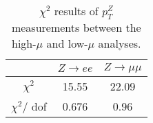 \begin{table}[h]
 \centering
\begin{tabular}{|c|c|c|}
\hline
  & $Z\rightarrow ee$ & $Z\rightarrow \mu\mu$\\
 \hline
 $\chi^2$ & 15.55 & 22.09 \\
 \hline
$\chi^2/$ dof & 0.676 & 0.96\\
\hline
\end{tabular}
\caption{$\chi^2$ results of $p_{T}^{Z}$ measurements between the high-$\mu$ and low-$\mu$  analyses.}
\label{tab:chi2highmuRew}
\end{table}
